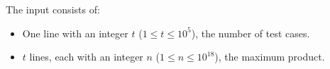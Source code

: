 
	The input consists of:
	\begin{itemize}
		\item One line with an integer $t$ ($1 \leq t \leq 10^5$), the number of test cases.
    \item $t$ lines, each with an integer $n$ ($1 \leq n \leq 10^{18}$), the maximum product.
	\end{itemize}
